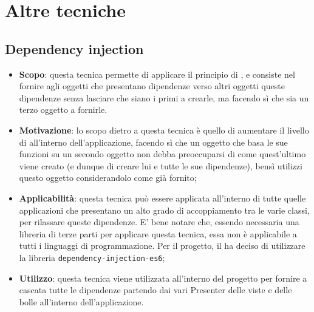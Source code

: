 \section{Altre tecniche}
\subsection{Dependency injection}
\begin{itemize}
	\item \textbf{Scopo}: questa tecnica permette di applicare il principio di , e consiste nel fornire agli oggetti che presentano dipendenze verso altri oggetti queste dipendenze senza lasciare che siano i primi a crearle, ma facendo sì che sia un terzo oggetto a fornirle.
	\item \textbf{Motivazione}: lo scopo dietro a questa tecnica è quello di aumentare il livello di  all'interno dell'applicazione, facendo sì che un oggetto che basa le sue funzioni su un secondo oggetto non debba preoccuparsi di come quest'ultimo viene creato (e dunque di creare lui e tutte le sue dipendenze), bensì utilizzi questo oggetto considerandolo come già fornito;
	\item \textbf{Applicabilità}: questa tecnica può essere applicata all'interno di tutte quelle applicazioni che presentano un alto grado di accoppiamento tra le varie classi, per rilassare queste dipendenze. E' bene notare che, essendo necessaria una libreria di terze parti per applicare questa tecnica, essa non è applicabile a tutti i linguaggi di programmazione. Per il progetto, il  ha deciso di utilizzare la libreria \texttt{dependency-injection-es6};
	\item \textbf{Utilizzo}: questa tecnica viene utilizzata all'interno del progetto per fornire a cascata tutte le dipendenze partendo dai vari Presenter delle viste e delle bolle all'interno dell'applicazione.
\end{itemize}